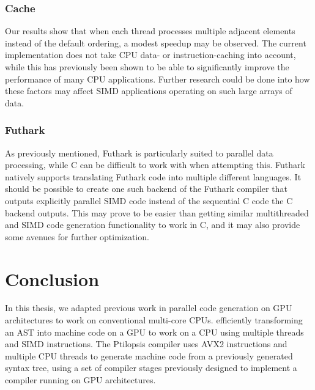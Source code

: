 \documentclass[11pt,dvipsnames]{article}
\newcommand{\Rplus}{\protect\hspace{-.1em}\protect\raisebox{.35ex}{\smaller{\smaller\textbf{+}}}}
\newcommand{\Cpp}{\mbox{C\Rplus\Rplus}\xspace}
\begin{document}
\subsubsection*{Cache}
Our results show that when each thread processes multiple adjacent elements instead of the default ordering, a modest speedup may be observed. The current implementation does not take CPU data- or instruction-caching into account, while this has previously been shown to be able to significantly improve the performance of many CPU applications. Further research could be done into how these factors may affect SIMD applications operating on such large arrays of data.

\subsubsection*{Futhark}
As previously mentioned, Futhark is particularly suited to parallel data processing, while \Cpp can be difficult to work with when attempting this. Futhark natively supports translating Futhark code into multiple different languages. It should be possible to create one such backend of the Futhark compiler that outputs explicitly parallel SIMD code instead of the sequential C code the C backend outputs. This may prove to be easier than getting similar multithreaded and SIMD code generation functionality to work in \Cpp, and it may also provide some avenues for further optimization.

\section{Conclusion} \label{conclusion}
In this thesis, we adapted previous work in parallel code generation on GPU architectures to work on conventional multi-core CPUs. efficiently transforming an AST into machine code on a GPU to work on a CPU using multiple threads and SIMD instructions. The Ptilopsis compiler uses AVX2 instructions and multiple CPU threads to generate machine code from a previously generated syntax tree, using a set of compiler stages previously designed to implement a compiler running on GPU architectures.
\end{document}
